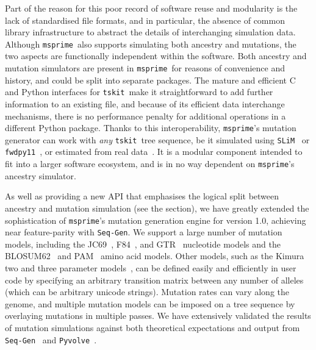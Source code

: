 \documentclass{article}
\newcommand{\msprime}[0]{\texttt{msprime}}
\newcommand{\tskit}[0]{\texttt{tskit}}
\newcommand{\SLiM}[0]{\texttt{SLiM}}
\newcommand{\fwdpy}[0]{\texttt{fwdpy11}}
\newcommand{\SeqGen}[0]{\texttt{Seq-Gen}}
\newcommand{\Pyvolve}[0]{\texttt{Pyvolve}}
\begin{document}
Part of the reason for this poor record of software reuse and modularity is the
lack of standardised file formats, and in particular, the absence of common
library infrastructure to abstract the details of interchanging simulation
data. Although \msprime\ also supports simulating both ancestry and mutations,
the two aspects are functionally independent within the software.
Both ancestry and mutation simulators are present in \msprime\
for reasons of convenience and history,
and could be split into separate packages.
The mature and efficient C and Python interfaces for
\tskit\ make it straightforward to add further information to
an existing file, and because of its efficient data interchange mechanisms,
there is no performance penalty for additional operations
in a different Python package.
Thanks to this interoperability, \msprime's
mutation generator can work with \emph{any} \tskit\ tree sequence,
be it simulated using \SLiM~\citep{haller2019slim} or
\fwdpy~\citep{thornton2014cpp}, or estimated from real
data~\citep{kelleher2019inferring,speidel2019method,wohns2021unified}.
It is a modular
component intended to fit into a larger software ecosystem, and
is in no way dependent on \msprime's ancestry simulator.

As well as providing a new API
that emphasises the logical split between ancestry and mutation simulation
(see the \nameref{sec-sim-interface} section),
we have greatly extended the sophistication of
\msprime's mutation generation engine for version 1.0,
achieving near feature-parity with \SeqGen.
We support a large number of mutation models, including the
JC69~\citep{jukes1969evolution},
F84~\citep{felsenstein1996hidden},
and GTR~\citep{tavare1986some} nucleotide models
and the BLOSUM62~\citep{henikoff1992amino}
and PAM~\citep{dayhoff1978} amino acid models.
Other models, such as the Kimura two and three
parameter models~\citep{kimura1980simple,kimura1981estimation},
can be defined easily and efficiently in
user code by specifying an arbitrary transition matrix between
any number of alleles (which can be arbitrary unicode strings).
Mutation rates can vary along the genome, and multiple mutation
models can be imposed on a tree sequence by overlaying mutations
in multiple passes.
We have extensively validated the results of mutation simulations
against both theoretical expectations and output from
\SeqGen~\citep{rambaut1997seq} and
\Pyvolve~\citep{spielman2015pyvolve}.
\end{document}
